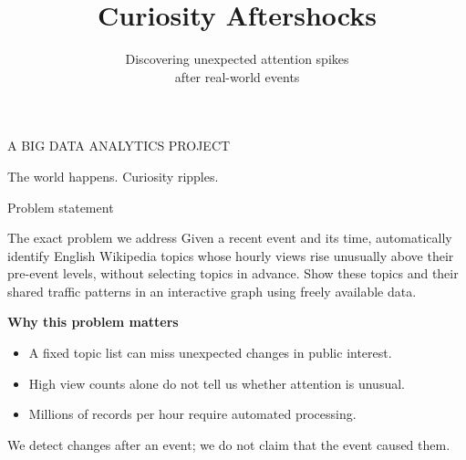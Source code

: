 \documentclass[aspectratio=169,10pt]{beamer}
\title{Curiosity Aftershocks}
\subtitle{Discovering unexpected attention spikes\texorpdfstring{\\}{ }after real-world events}
\author{}
\institute{}
\newcommand{\takeaway}[1]{\vfill{\color{Lime}\small #1}}
\begin{document}
\begin{frame}[plain]
\vspace{8mm}
{\color{Muted}\small A BIG DATA ANALYTICS PROJECT}\par\vspace{8mm}
{\color{Lime}\inserttitle}\par\vspace{4mm}
{\Large\insertsubtitle}\par\vspace{9mm}
{\color{Cyan}The world happens. Curiosity ripples.}\par\vfill

{\scriptsize\color{Muted}\insertdate}
\end{frame}

\begin{frame}{Problem statement}
\begin{block}{The exact problem we address}
Given a recent event and its time, automatically identify English Wikipedia topics whose hourly views rise unusually above their pre-event levels, without selecting topics in advance. Show these topics and their shared traffic patterns in an interactive graph using freely available data.
\end{block}
\vspace{4mm}
\textbf{Why this problem matters}
\begin{itemize}\setlength\itemsep{3mm}
\item A fixed topic list can miss unexpected changes in public interest.
\item High view counts alone do not tell us whether attention is unusual.
\item Millions of records per hour require automated processing.
\end{itemize}
\takeaway{We detect changes after an event; we do not claim that the event caused them.}
\end{frame}
\end{document}
